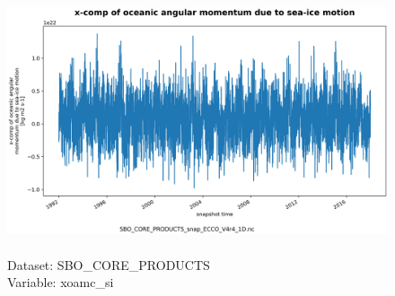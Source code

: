 \begin{figure}[H]
\centering
\includegraphics[scale=0.5]{../images/plots/oneD_plots/SBO_Core_Products/xoamc_si.png}
\caption{\\Dataset: SBO\_CORE\_PRODUCTS\\Variable: xoamc\_si}
\label{tab:table-SBO_CORE_PRODUCTS_xoamc_si-Plot}
\end{figure}
\pagebreak
